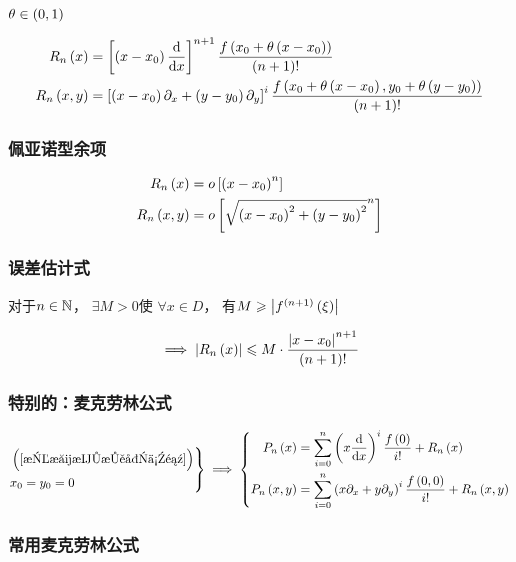 \documentclass{article}
\begin{document}
$\theta\in\left(0,1\right)$

\[\begin{aligned}
        R_n\left(x\right)    & =
        \left[\left(x-x_0\right)\frac{\mathrm d}{\mathrm d x}\right]^{n+1}\frac{f\left(x_0+\theta\left(x-x_0\right)\right)}{\left(n+1\right)!} \\
        R_n\left(x,y\right) & =
        \left[\left(x-x_0\right)\partial_x+\left(y-y_0\right)\partial_y\right]^i\frac{f\left(x_0+\theta\left(x-x_0\right),y_0+\theta\left(y-y_0\right)\right)}{\left(n+1\right)!}
    \end{aligned}\]

\subsubsection{佩亚诺型余项}

\[\begin{aligned}
        R_n\left(x\right)    & =
        o\left[\left(x-x_0\right)^n\right] \\
        R_n\left(x,y\right) & =
        o\left[\sqrt{\left(x-x_0\right)^2+\left(y-y_0\right)^2}^n\right]
    \end{aligned}\]

\subsubsection{误差估计式}

对于$n\in\mathbb N$，
$\exists M>0$使
$\forall x\in D$，
有$M\geqslant\left|f^{\left(n+1\right)}\left(\xi\right)\right|$

\[\implies\left|R_n\left(x\right)\right|\leqslant M\cdot\frac{\left|x-x_0\right|^{n+1}}{\left(n+1\right)!}\]

\subsubsection{特别的：麦克劳林公式}

\[\left.\begin{aligned}
         & \left(\ref{拉格朗日型余项}\right) \\
         & x_0=y_0=0
    \end{aligned}\right\}
    \implies
    \left\{\begin{aligned}
        P_n\left(x\right)    & =\sum_{i=0}^n\left(x\frac{\mathrm d}{\mathrm d x}\right)^i\frac{f\left(0\right)}{i!}+R_n\left(x\right)                 \\
        P_n\left(x,y\right) & =\sum_{i=0}^n\left(x\partial_x+y\partial_y\right)^i\frac{f\left(0,0\right)}{i!}+R_n\left(x,y\right)
    \end{aligned}\right.\]

\subsubsection{常用麦克劳林公式}
\end{document}
